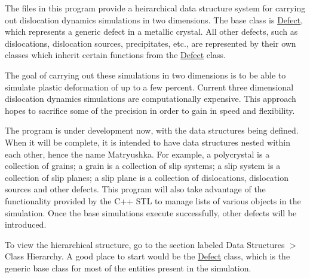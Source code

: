 The files in this program provide a heirarchical data structure system for carrying out dislocation dynamics simulations in two dimensions. The base class is \hyperlink{classDefect}{Defect}, which represents a generic defect in a metallic crystal. All other defects, such as dislocations, dislocation sources, precipitates, etc., are represented by their own classes which inherit certain functions from the \hyperlink{classDefect}{Defect} class.

The goal of carrying out these simulations in two dimensions is to be able to simulate plastic deformation of up to a few percent. Current three dimensional dislocation dynamics simulations are computationally expensive. This approach hopes to sacrifice some of the precision in order to gain in speed and flexibility.

The program is under development now, with the data structures being defined. When it will be complete, it is intended to have data structures nested within each other, hence the name Matryushka. For example, a polycrystal is a collection of grains; a grain is a collection of slip systems; a slip system is a collection of slip planes; a slip plane is a collection of dislocations, dislocation sources and other defects. This program will also take advantage of the functionality provided by the C++ S\-T\-L to manage lists of various objects in the simulation. Once the base simulations execute successfully, other defects will be introduced.

To view the hierarchical structure, go to the section labeled Data Structures $>$ Class Hierarchy. A good place to start would be the \hyperlink{classDefect}{Defect} class, which is the generic base class for most of the entities present in the simulation. 